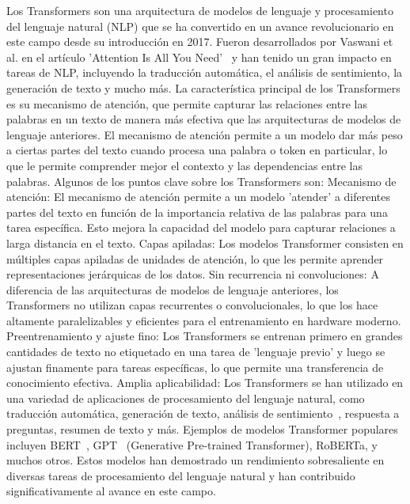 Los Transformers son una arquitectura de modelos de lenguaje y procesamiento del lenguaje natural (NLP)
que se ha convertido en un avance revolucionario en este campo desde su introducción en 2017.
Fueron desarrollados por Vaswani et al. en el artículo 'Attention Is All You Need'~\cite{vaswani2023attention}
y han tenido un gran impacto en tareas de NLP, incluyendo la traducción automática,
el análisis de sentimiento, la generación de texto y mucho más.
La característica principal de los Transformers es su mecanismo de atención,
que permite capturar las relaciones entre las palabras en un texto
de manera más efectiva que las arquitecturas de modelos de lenguaje anteriores.
El mecanismo de atención permite a un modelo dar más peso a ciertas partes del texto
cuando procesa una palabra o token en particular, lo que le permite comprender
mejor el contexto y las dependencias entre las palabras.
Algunos de los puntos clave sobre los Transformers son:
Mecanismo de atención: El mecanismo de atención permite a un modelo 'atender' a diferentes 
partes del texto en función de la importancia relativa de las palabras para una tarea específica. 
Esto mejora la capacidad del modelo para capturar relaciones a larga distancia en el texto.
Capas apiladas: Los modelos Transformer consisten en múltiples capas apiladas 
de unidades de atención, lo que les permite aprender representaciones jerárquicas de los datos.
Sin recurrencia ni convoluciones: A diferencia de las arquitecturas de modelos 
de lenguaje anteriores, los Transformers no utilizan capas recurrentes o convolucionales, 
lo que los hace altamente paralelizables y eficientes para el entrenamiento en hardware moderno.
Preentrenamiento y ajuste fino: Los Transformers se entrenan primero en grandes 
cantidades de texto no etiquetado en una tarea de 'lenguaje previo' y luego se ajustan 
finamente para tareas específicas, lo que permite una transferencia de conocimiento efectiva.
Amplia aplicabilidad: Los Transformers se han utilizado en una variedad de aplicaciones de 
procesamiento del lenguaje natural, como traducción automática, generación de texto, 
análisis de sentimiento~\cite{UrdanetaTransformers}, respuesta a preguntas, resumen de texto y más.
Ejemplos de modelos Transformer populares incluyen BERT~\cite{devlin2019bert}, 
GPT~\cite{chatgpt1} (Generative Pre-trained Transformer), RoBERTa, y muchos otros. 
Estos modelos han demostrado un rendimiento sobresaliente en diversas 
tareas de procesamiento del lenguaje natural y han contribuido significativamente al avance en este campo.



